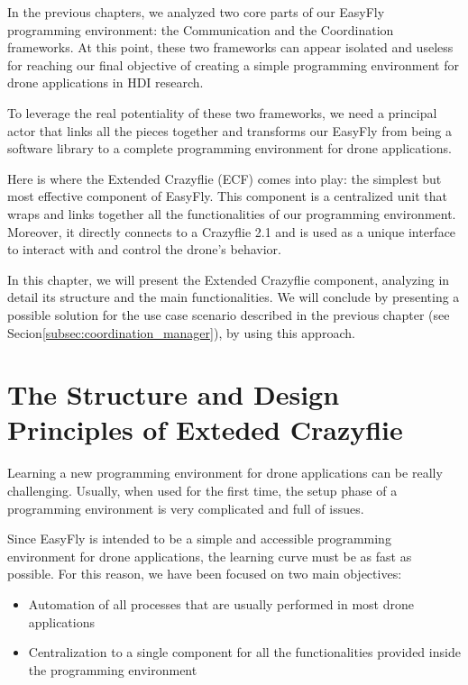 In the previous chapters, we analyzed two core parts of our EasyFly programming environment: the Communication and the Coordination frameworks.
At this point, these two frameworks can appear isolated and useless for reaching our final objective of creating a simple programming environment for drone applications in HDI research.

To leverage the real potentiality of these two frameworks, we need a principal actor that links all the pieces together and transforms our EasyFly from being a software library to a complete programming environment for drone applications.

Here is where the Extended Crazyflie (ECF) comes into play: the simplest but most effective component of EasyFly. 
This component is a centralized unit that wraps and links together all the functionalities of our programming environment. 
Moreover, it directly connects to a Crazyflie 2.1 and is used as a unique interface to interact with and control the drone's behavior.

In this chapter, we will present the Extended Crazyflie component, analyzing in detail its structure and the main functionalities. 
We will conclude by presenting a possible solution for the use case scenario described in the previous chapter (see Secion\ref{subsec:coordination_manager}),
by using this approach.


\section{The Structure and Design Principles of Exteded Crazyflie}\label{sec:ecf_structure_design}

Learning a new programming environment for drone applications can be really challenging. 
Usually, when used for the first time, the setup phase of a programming environment is very complicated and full of issues. 

Since EasyFly is intended to be a simple and accessible programming environment for drone applications, the learning curve must be as fast as possible.
For this reason, we have been focused on two main objectives:
\begin{itemize}
    \item Automation of all processes that are usually performed in most drone applications
    \item Centralization to a single component for all the functionalities provided inside the programming environment
\end{itemize}

